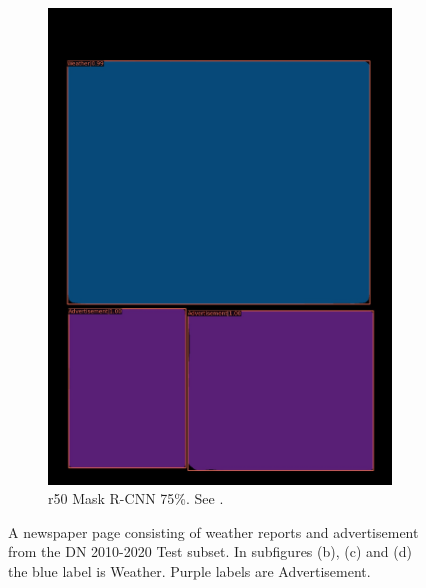 \documentclass[oneside, english, bibtex]{kththesis}
\begin{document}
\begin{figure}[!htb]
\begin{adjustbox}{center,max size={\textwidth}{0.9\textheight}}
{\begin{subfigure}{0.6\textwidth}
\includegraphics[width=\linewidth]{figures/labels-vanilla-0.75/Jd55Bvg.jpg}
  \caption{r50 Mask R-CNN 75\%. See . }
  \label{fig:Jd55Bvg_pred}
\end{subfigure}}
\end{adjustbox}
  \caption{A newspaper page consisting of weather reports and advertisement from the DN 2010-2020 Test subset. In subfigures (b), (c) and (d) the blue label is Weather. Purple labels are Advertisement.}
\label{fig:Jd55Bvg}
\end{figure}
\clearpage

\end{document}
